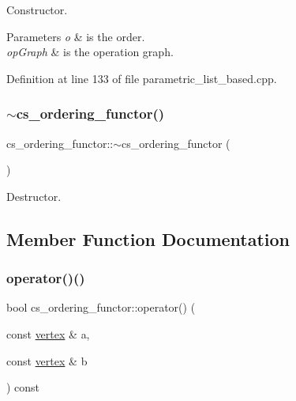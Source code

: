 Constructor. 


\begin{DoxyParams}{Parameters}
{\em o} & is the order. \\
\hline
{\em op\+Graph} & is the operation graph. \\
\hline
\end{DoxyParams}


Definition at line 133 of file parametric\+\_\+list\+\_\+based.\+cpp.

\mbox{\label{structcs__ordering__functor_ab9690bb40e4779bd321d16ecc468c07d}} 
\subsubsection{\texorpdfstring{$\sim$cs\+\_\+ordering\+\_\+functor()}{~cs\_ordering\_functor()}}
{\footnotesize\ttfamily cs\+\_\+ordering\+\_\+functor\+::$\sim$cs\+\_\+ordering\+\_\+functor (\begin{DoxyParamCaption}{ }\end{DoxyParamCaption})\hspace{0.3cm}{\ttfamily [default]}}



Destructor. 



\subsection{Member Function Documentation}
\mbox{\label{structcs__ordering__functor_a28ed85c1fa17891458b852ef8cb58f57}} 
\subsubsection{\texorpdfstring{operator()()}{operator()()}}
{\footnotesize\ttfamily bool cs\+\_\+ordering\+\_\+functor\+::operator() (\begin{DoxyParamCaption}\item[{const \hyperlink{graph_8hpp_abefdcf0544e601805af44eca032cca14}{vertex} \&}]{a,  }\item[{const \hyperlink{graph_8hpp_abefdcf0544e601805af44eca032cca14}{vertex} \&}]{b }\end{DoxyParamCaption}) const\hspace{0.3cm}{\ttfamily [inline]}}



